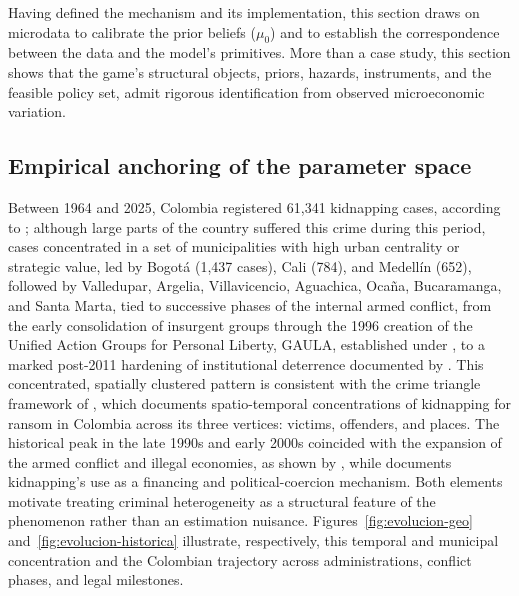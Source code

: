 \documentclass[pdflatex,sn-mathphys-ay]{sn-jnl}
\theoremstyle{plain}
\theoremstyle{definition}
\newcommand{\1}{\mathbf{1}}
\begin{document}
Having defined the mechanism and its implementation, this section draws on microdata to calibrate the prior beliefs ($\mu_0$) and to establish the correspondence between the data and the model's primitives. More than a case study, this section shows that the game's structural objects, priors, hazards, instruments, and the feasible policy set, admit rigorous identification from observed microeconomic variation.

\subsection{Empirical anchoring of the parameter space}\label{sec:institutional}

Between 1964 and 2025, Colombia registered 61,341 kidnapping cases, according to \citet{cnmh_datos}; although large parts of the country suffered this crime during this period, cases concentrated in a set of municipalities with high urban centrality or strategic value, led by Bogotá (1,437 cases), Cali (784), and Medellín (652), followed by Valledupar, Argelia, Villavicencio, Aguachica, Ocaña, Bucaramanga, and Santa Marta, tied to successive phases of the internal armed conflict, from the early consolidation of insurgent groups through the 1996 creation of the Unified Action Groups for Personal Liberty, GAULA, established under \citet{ley282_1996}, to a marked post-2011 hardening of institutional deterrence documented by \citet{CNMH2013}. This concentrated, spatially clustered pattern is consistent with the crime triangle framework of \citet{Pires2014}, which documents spatio-temporal concentrations of kidnapping for ransom in Colombia across its three vertices: victims, offenders, and places. The historical peak in the late 1990s and early 2000s coincided with the expansion of the armed conflict and illegal economies, as shown by \citet{pinto2004}, while \citet{Zarate2007} documents kidnapping's use as a financing and political-coercion mechanism. Both elements motivate treating criminal heterogeneity as a structural feature of the phenomenon rather than an estimation nuisance. Figures~\ref{fig:evolucion-geo} and~\ref{fig:evolucion-historica} illustrate, respectively, this temporal and municipal concentration and the Colombian trajectory across administrations, conflict phases, and legal milestones.
\end{document}

